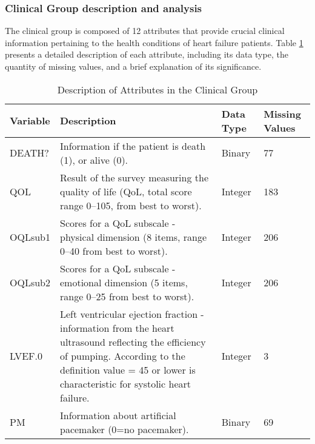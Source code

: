 \subsubsection{Clinical Group description and analysis}
        The clinical group is composed of 12 attributes that provide crucial clinical information pertaining to the health conditions of heart failure patients. Table \ref{tab:clinical group} presents a detailed description of each attribute, including its data type, the quantity of missing values, and a brief explanation of its significance.
        
        \begin{table}[H]
        \centering
        \caption{Description of Attributes in the Clinical Group}
        \label{tab:clinical group}
            \begin{adjustbox}{center}
            \begin{tabular}{|p{2cm}|p{10cm}|p{1.8cm}|p{1.8cm}|}
            \hline
                \textbf{Variable} & \textbf{Description}                                                                                   & \textbf{Data Type} & \textbf{Missing Values} \\ \hline
                DEATH?            & Information if the patient is death (1), or alive (0).                                                 & Binary             & 77                      \\
                QOL               & Result of the survey measuring the quality of life (QoL, total score range 0–105, from best to worst). & Integer            & 183                     \\
                OQLsub1           & Scores for a QoL subscale - physical dimension (8 items, range 0–40 from best to worst).               & Integer            & 206                     \\
                OQLsub2           & Scores for a QoL subscale - emotional dimension (5 items, range 0–25 from best to worst).              & Integer            & 206                     \\
                LVEF.0 &
                  Left ventricular ejection fraction - information from the heart ultrasound reflecting the efficiency of pumping. According to the definition value = 45 or lower is characteristic for systolic heart failure. &
                  Integer &
                  3 \\
                PM                & Information about artificial pacemaker (0=no pacemaker).                                               & Binary             & 69                      \\

\end{tabular}
\end{adjustbox}
\end{table}
